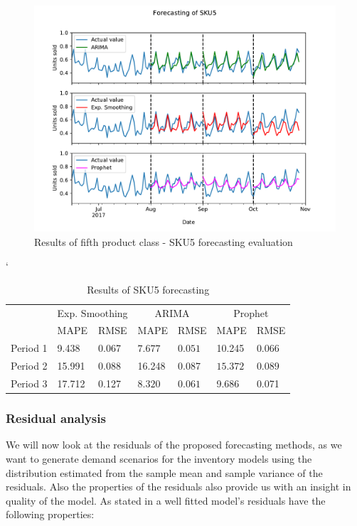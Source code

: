 \documentclass[11pt,a4paper]{article}
\begin{document}
\begin{figure}
  \includegraphics[width=1\linewidth]{figures/SKU5_sep.pdf}
  \caption{Results of fifth product class - SKU5 forecasting evaluation}
  \label{fig:sku5_sep}
\end{figure}


\begin{table} \catcode`
\centering
\begin{tabular}{|l|l|l|l|l|l|l|}
\hline
\multirow{2}{*}{} & \multicolumn{2}{c|}{Exp. Smoothing} & \multicolumn{2}{c|}{ARIMA} & \multicolumn{2}{c|}{Prophet} \\ \cline{2-7} 
                  & MAPE        & RMSE        & MAPE           & RMSE          & MAPE          & RMSE         \\ \hline
Period 1  &9.438 & 0.067 & \boldmath$7.677$\unboldmath & \boldmath$0.051$\unboldmath & 10.245 & 0.066  \\ \hline
Period 2  & 15.991 & 0.088 & 16.248 & 0.087 & \boldmath$15.372$\unboldmath & \boldmath$0.089$\unboldmath  \\ \hline
 Period 3  & 17.712 & 0.127 & \boldmath$8.320$\unboldmath & \boldmath$0.061$\unboldmath & 9.686 & 0.071  \\ \hline
\end{tabular}
\caption{Results of SKU5 forecasting}
\label{tbl:forecast_5}
\end{table}
\newpage

\subsubsection{Residual analysis}
We will now look at the residuals of the proposed forecasting methods, as we want to generate demand scenarios  for the inventory models using the distribution estimated from the sample mean and sample variance of the residuals. Also the properties of the residuals also provide us with an insight in quality of the model. 
As stated in \cite{hyndman2014forecasting} a well fitted model's residuals have the following properties:
\end{document}
